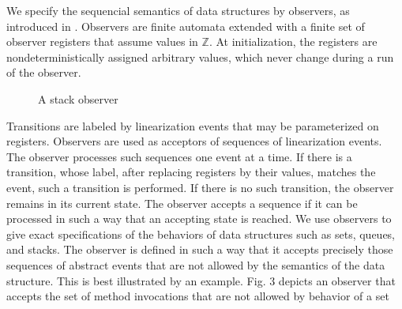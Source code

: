 We specify the sequencial semantics of data structures by observers, as introduced
in \cite{AHHR:integrated:rep}. Observers are finite automata extended with a finite set of observer registers that
assume values in $\mathbb Z$. At initialization, the registers are nondeterministically assigned arbitrary
values, which never change during a run of the observer. 
\vspace{1cm}
\begin{figure}[h]
  \centering
  \vspace{0.3cm}
  \caption{A stack observer}
  \label{figure:shape:set:observers}
\end{figure} \vspace{1cm} Transitions are labeled
by linearization events that may be parameterized on registers. Observers are used as
acceptors of sequences of linearization events. The observer processes such sequences
one event at a time. If there is a transition, whose label, after replacing registers by their values, matches the event, such a transition is performed. If there is no such transition,
the observer remains in its current state. The observer accepts a sequence if it can be
processed in such a way that an accepting state is reached. We use observers to give exact specifications of the behaviors of data structures such as sets, queues, and stacks. The observer is defined in such a way that it accepts
precisely those sequences of abstract events that are not allowed by the semantics of
the data structure. This is best illustrated by an example. Fig. 3 depicts an observer that
accepts the set of method invocations that are not allowed by behavior of a set 


